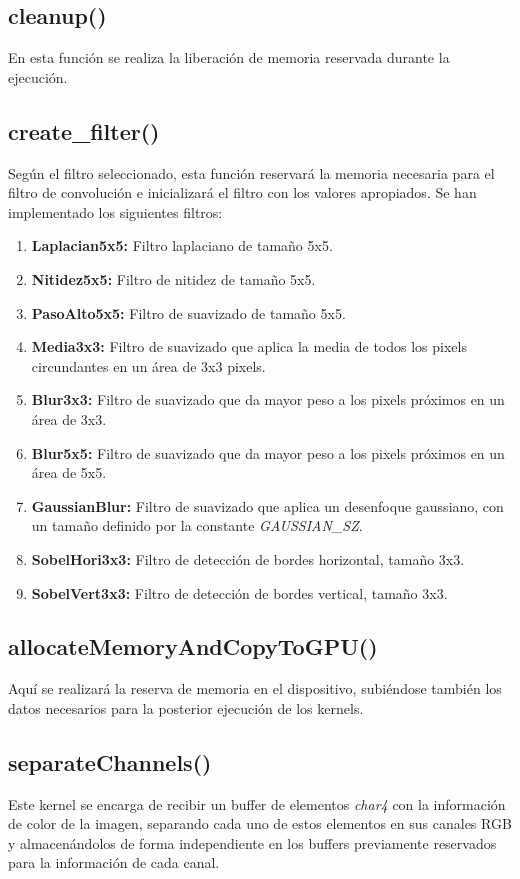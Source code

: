 \documentclass[10pt,oneside,a4paper]{article}
\begin{document}
\subsection{cleanup()}
En esta función se realiza la liberación de memoria reservada durante la ejecución.

\subsection{create\_filter()}
Según el filtro seleccionado, esta función reservará la memoria necesaria para el filtro de convolución e inicializará el filtro con los valores apropiados. Se han implementado los siguientes filtros:

\begin{enumerate}
  \item \textbf{Laplacian5x5:} Filtro laplaciano de tamaño 5x5.
  \item \textbf{Nitidez5x5:} Filtro de nitidez de tamaño 5x5.
  \item \textbf{ PasoAlto5x5:} Filtro de suavizado de tamaño 5x5.
  \item \textbf{Media3x3:} Filtro de suavizado que aplica la media de todos los pixels circundantes en un área de 3x3 pixels.
  \item \textbf{Blur3x3:} Filtro de suavizado que da mayor peso a los pixels próximos en un área de 3x3.
  \item \textbf{Blur5x5:} Filtro de suavizado que da mayor peso a los pixels próximos en un área de 5x5.
  \item \textbf{GaussianBlur:} Filtro de suavizado que aplica un desenfoque gaussiano, con un tamaño definido por la constante \textit{GAUSSIAN\_SZ}.
  \item \textbf{SobelHori3x3:} Filtro de detección de bordes horizontal, tamaño 3x3.
  \item \textbf{SobelVert3x3:} Filtro de detección de bordes vertical, tamaño 3x3.
\end{enumerate}

\subsection{allocateMemoryAndCopyToGPU()}
Aquí se realizará la reserva de memoria en el dispositivo, subiéndose también los datos necesarios para la posterior ejecución de los kernels.

\subsection{separateChannels()}
Este kernel se encarga de recibir un buffer de elementos \textit{char4} con la información de color de la imagen, separando cada uno de estos elementos en sus canales RGB y almacenándolos de forma independiente en los buffers previamente reservados para la información de cada canal.
\end{document}
